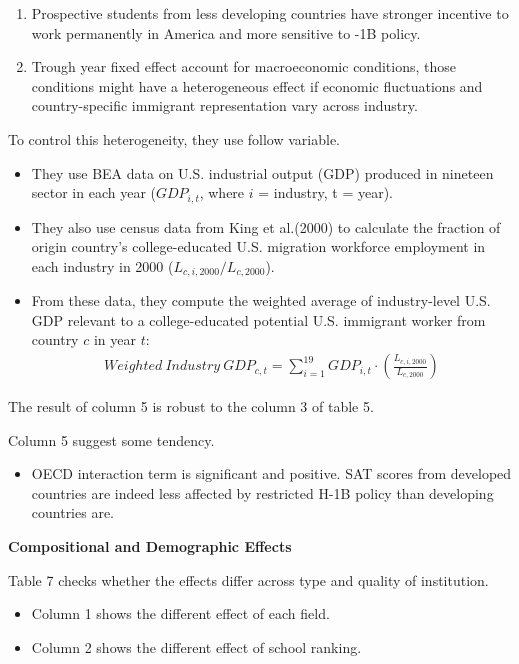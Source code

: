\documentclass[../root]{subfiles}
\begin{document}
   \begin{enumerate}
       \item Prospective students from less developing countries have stronger incentive to work permanently in America and more sensitive to -1B policy.
       \item Trough year fixed effect account for macroeconomic conditions, those conditions might have a heterogeneous effect if economic fluctuations and country-specific immigrant representation vary across industry.  
   \end{enumerate}
   
   To control this heterogeneity, they use follow variable.
   \begin{itemize}
       \item They use BEA data on U.S. industrial output (GDP) produced in nineteen sector in each year ($GDP_{i,t}$, where $i$ = industry, t =  year).
       \item They also use census data from King et al.(2000) to calculate the fraction of origin country's college-educated U.S. migration workforce employment in each industry in 2000 ($L_{c, i, 2000}/L_{c, 2000}$).  
       \item From these data, they compute the weighted average of industry-level U.S. GDP relevant to a college-educated potential U.S. immigrant worker from country $c$ in year $t$:
       \begin{align}
           Weighted \ Industry \ GDP_{c, t} = \sum^{19}_{i=1} GDP_{i, t} \cdot \left(\frac{L_{c, i, 2000}}{L_{c, 2000}} \right) 
       \end{align}
   \end{itemize}
   
   The result of column 5 is robust to the column 3 of table 5.  
   
   Column 5 suggest some tendency.
   \begin{itemize}
       \item OECD interaction term is significant and positive. SAT scores from developed countries are indeed less affected by restricted H-1B policy than developing countries are.
   \end{itemize}
   
   {\bf Compositional and Demographic Effects}
   
   Table 7 checks whether the effects differ across type and quality of institution. 
   \begin{itemize}
       \item Column 1 shows the different effect of each field.
       \item Column 2 shows the different effect of school ranking.
   \end{itemize}
   
\end{document}
